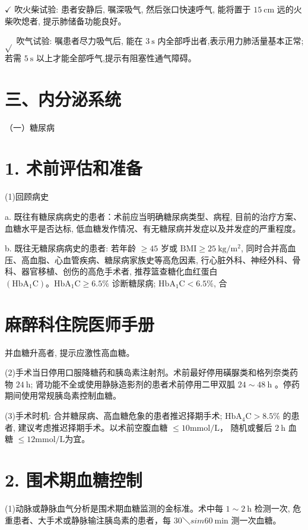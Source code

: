 \documentclass[10pt]{article}
\begin{document}
$\checkmark$ 吹火柴试验: 患者安静后, 嘱深吸气, 然后张口快速呼气, 能将置于 $15 \mathrm{~cm}$ 远的火柴吹熄者, 提示肺储备功能良好。

$\sqrt{ }$ 吹气试验: 嘱患者尽力吸气后, 能在 $3 \mathrm{~s}$ 内全部呼出者,表示用力肺活量基本正常; 若需 $5 \mathrm{~s}$ 以上才能全部呼气,提示有阻塞性通气障碍。

\section*{三、内分泌系统}
（一）糖尿病

\section*{1. 术前评估和准备}
(1)回顾病史

a. 既往有糖尿病病史的患者：术前应当明确糖尿病类型、病程, 目前的治疗方案、血糖水平是否达标, 低血糖发作情况、有无糖尿病并发症以及并发症的严重程度。

b. 既往无糖尿病病史的患者: 若年龄 $\geqslant 45$ 岁或 $\mathrm{BMI} \geqslant 25 \mathrm{~kg} / \mathrm{m}^{2}$, 同时合并高血压、高血脂、心血管疾病、糖尿病家族史等高危因素, 行心脏外科、神经外科、骨科、器官移植、创伤的高危手术者, 推荐篮查糖化血红蛋白 $\left(\mathrm{HbA}_{1} \mathrm{C}\right) 。 \mathrm{HbA}_{1} \mathrm{C} \geqslant 6.5 \%$ 诊断糖尿病; $\mathrm{HbA}_{1} \mathrm{C}<6.5 \%$, 合

\section*{麻醉科住院医师手册}
并血糖升高者, 提示应激性高血糖。

(2)手术当日停用口服降糖药和胰岛素注射剂。术前最好停用磺脲类和格列奈类药物 $24 \mathrm{~h}$; 肾功能不全或使用静脉造影剂的患者术前停用二甲双胍 $24 \sim 48 \mathrm{~h}$ 。停药期间使用常规胰岛素控制血糖。

(3)手术时机: 合并糖尿病、高血糖危象的患者推迟择期手术; $\mathrm{HbA}_{4} \mathrm{C}>8.5 \%$ 的患者, 建议考虑推迟择期手术。以术前空腹血糖 $\leqslant 10 \mathrm{mmol} / \mathrm{L} ，$ 随机或餐后 $2 \mathrm{~h}$ 血糖 $\leqslant 12 \mathrm{mmol} / \mathrm{L}$为宜。

\section*{2. 围术期血糖控制}
(1)动脉或静脉血气分析是围术期血糖监测的金标准。术中每 $1 \sim 2 \mathrm{~h}$ 检测一次, 危重患者、大手术或静脉输注胰岛素的患者，每 $30 ＼sim 60 \mathrm{~min}$ 测一次血糖。
\end{document}
